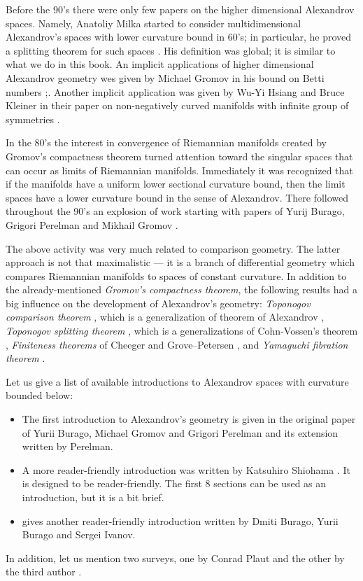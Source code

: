 Before the 90's  there were only few papers on the higher dimensional Alexandrov spaces.
Namely, Anatoliy Milka started to consider multidimensional Alexandrov's spaces with lower curvature bound in 60's;
in particular, he proved a splitting theorem for such spaces \cite{milka-line}.
His definition was global; it is similar to what we do in this book.
An implicit applications of higher dimensional Alexandrov geometry wes given by Michael Gromov in his bound on Betti numbers \cite{gromov:betti};.
Another implicit application was given by Wu-Yi Hsiang and Bruce Kleiner in their paper on non-negatively curved manifolds with infinite group of symmetries \cite{hsiang-kleiner}.


In the 80's the interest in convergence of Riemannian manifolds created by Gromov's compactness theorem \cite{gomov-precompactness} turned attention toward the singular spaces that can occur as limits of Riemannian manifolds. 
Immediately it was recognized that if the manifolds have a uniform lower sectional curvature bound, then the limit spaces have a lower curvature bound in the sense of Alexandrov. 
There followed throughout the 90's an explosion of work starting with papers of Yurij Burago, Grigori Perelman and Mikhail Gromov  \cite{BGP,perelman:spaces2}.

The above activity was very much related to comparison geometry.
The latter approach is not that maximalistic --- it is a branch of differential geometry which compares Riemannian manifolds  to  spaces of constant curvature.
In addition to the already-mentioned \emph{Gromov's compactness theorem},
the following results had a big influence on the development of Alexandrov's geometry:
\emph{Toponogov comparison theorem} \cite{toponogov-globalization+splitting}, which is a generalization of theorem of Alexandrov \cite{alexandrov-comparison},
\emph{Toponogov splitting theorem} \cite{toponogov-globalization+splitting}, which is a generalizations of Cohn-Vossen's theorem \cite{cohn-vossen_line},
\emph{Finiteness theorems} of
Cheeger and
Grove--Petersen \cite{cheeger-finiteness,grove-petersen:finiteness},
and 
\emph{Yamaguchi fibration theorem} \cite{yamaguchi-fibration}.


Let us give a list of available introductions to  Alexandrov spaces with curvature bounded below: 
\begin{itemize}
\item The first introduction to Alexandrov's geometry is given in the original paper of Yurii Burago, Michael Gromov and Grigori Perelman \cite{BGP} 
and its extension \cite{perelman:spaces2} written by Perelman.
\item A more reader-friendly  introduction was written by Katsuhiro Shiohama \cite{shiohama}.
It is designed to be reader-friendly.  
The first 8 sections can be used as an introduction, but it is a bit brief.
\item \cite[Chapter 10]{BBI} gives another reader-friendly introduction written by Dmiti Burago, Yurii Burago and Sergei Ivanov.
\end{itemize}
In addition, let us mention two surveys, one by Conrad Plaut \cite{plaut:survey} and the other by the third author \cite{petrunin:survey}.

